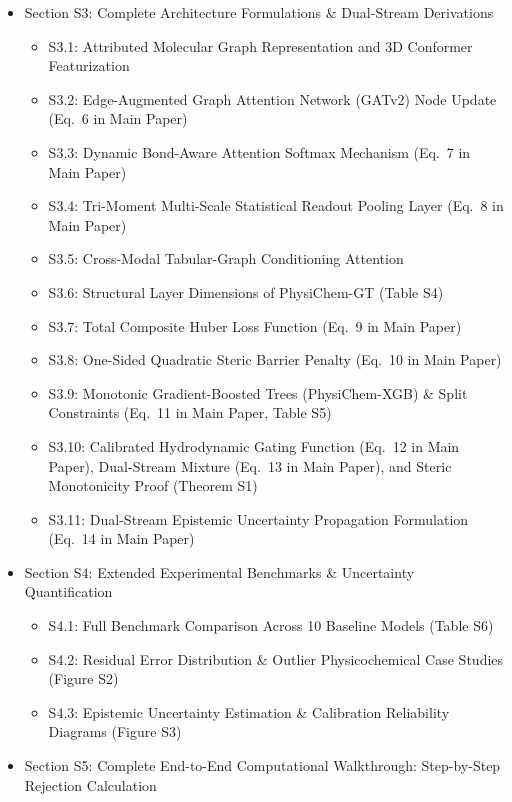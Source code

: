\documentclass[11pt]{article}
\begin{document}
\begin{itemize}[leftmargin=1.5cm, label=$\blacktriangleright$]
\begin{itemize}[label=$\circ$]
    \end{itemize}
    \item Section S3: Complete Architecture Formulations \& Dual-Stream Derivations
    \begin{itemize}[label=$\circ$]
        \item S3.1: Attributed Molecular Graph Representation and 3D Conformer Featurization
        \item S3.2: Edge-Augmented Graph Attention Network (GATv2) Node Update (Eq.~6 in Main Paper)
        \item S3.3: Dynamic Bond-Aware Attention Softmax Mechanism (Eq.~7 in Main Paper)
        \item S3.4: Tri-Moment Multi-Scale Statistical Readout Pooling Layer (Eq.~8 in Main Paper)
        \item S3.5: Cross-Modal Tabular-Graph Conditioning Attention
        \item S3.6: Structural Layer Dimensions of PhysiChem-GT (Table S4)
        \item S3.7: Total Composite Huber Loss Function (Eq.~9 in Main Paper)
        \item S3.8: One-Sided Quadratic Steric Barrier Penalty (Eq.~10 in Main Paper)
        \item S3.9: Monotonic Gradient-Boosted Trees (PhysiChem-XGB) \& Split Constraints (Eq.~11 in Main Paper, Table S5)
        \item S3.10: Calibrated Hydrodynamic Gating Function (Eq.~12 in Main Paper), Dual-Stream Mixture (Eq.~13 in Main Paper), and Steric Monotonicity Proof (Theorem S1)
        \item S3.11: Dual-Stream Epistemic Uncertainty Propagation Formulation (Eq.~14 in Main Paper)
    \end{itemize}
    \item Section S4: Extended Experimental Benchmarks \& Uncertainty Quantification
    \begin{itemize}[label=$\circ$]
        \item S4.1: Full Benchmark Comparison Across 10 Baseline Models (Table S6)
        \item S4.2: Residual Error Distribution \& Outlier Physicochemical Case Studies (Figure S2)
        \item S4.3: Epistemic Uncertainty Estimation \& Calibration Reliability Diagrams (Figure S3)
    \end{itemize}
    \item Section S5: Complete End-to-End Computational Walkthrough: Step-by-Step Rejection Calculation

\end{itemize}
\end{document}
